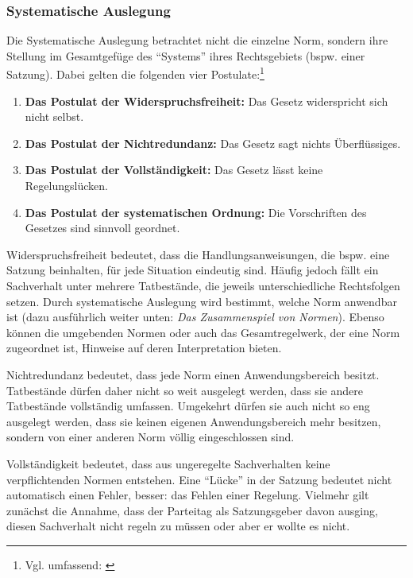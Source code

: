 \subsubsection{Systematische Auslegung}
Die Systematische Auslegung betrachtet nicht die einzelne Norm, sondern ihre Stellung im Gesamtgefüge des \enquote{Systems} ihres Rechtsgebiets (bspw. einer Satzung). Dabei gelten die folgenden vier Postulate:\footnote{Vgl. umfassend: \cite[S.~66~ff.]{Puppe2008}}
\begin{enumerate}
\item \textbf{Das Postulat der Widerspruchsfreiheit:} Das Gesetz widerspricht sich nicht selbst.
\item \textbf{Das Postulat der Nichtredundanz:} Das Gesetz sagt nichts Überflüssiges.
\item \textbf{Das Postulat der Vollständigkeit:} Das Gesetz lässt keine Regelungslücken.
\item \textbf{Das Postulat der systematischen Ordnung:} Die Vorschriften des Gesetzes sind sinnvoll geordnet.
\end{enumerate}

Widerspruchsfreiheit bedeutet, dass die Handlungsanweisungen, die bspw. eine Satzung beinhalten, für jede Situation eindeutig sind. Häufig jedoch fällt ein Sachverhalt unter mehrere Tatbestände, die jeweils unterschiedliche Rechtsfolgen setzen. Durch systematische Auslegung wird bestimmt, welche Norm anwendbar ist (dazu ausführlich weiter unten: \emph{Das Zusammenspiel von Normen}). Ebenso können die umgebenden Normen oder auch das Gesamtregelwerk, der eine Norm zugeordnet ist, Hinweise auf deren Interpretation bieten.

Nichtredundanz bedeutet, dass jede Norm einen Anwendungsbereich besitzt. Tatbestände dürfen daher nicht so weit ausgelegt werden, dass sie andere Tatbestände vollständig umfassen. Umgekehrt dürfen sie auch nicht so eng ausgelegt werden, dass sie keinen eigenen Anwendungsbereich mehr besitzen, sondern von einer anderen Norm völlig eingeschlossen sind.

Vollständigkeit bedeutet, dass aus ungeregelte Sachverhalten keine verpflichtenden Normen entstehen. Eine \enquote{Lücke} in der Satzung bedeutet nicht automatisch einen Fehler, besser: das Fehlen einer Regelung. Vielmehr gilt zunächst die Annahme, dass der Parteitag als Satzungsgeber davon ausging, diesen Sachverhalt nicht regeln zu müssen oder aber er wollte es nicht.

